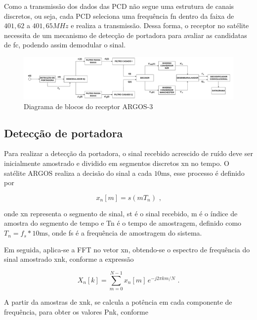 Como a transmissão dos dados das \gls{PCD} não segue uma estrutura de canais discretos, ou seja, cada \gls{PCD} seleciona uma frequência \gls{fn} dentro da faixa de $401,62$ a $401,65MHz$ e realiza a transmissão. Dessa forma, o receptor no satélite necessita de um mecanismo de detecção de portadora para avaliar as candidatas de \gls{fc}, podendo assim demodular o sinal.

\begin{figure}[H]
	\centering
	\caption{Diagrama de blocos do receptor ARGOS-3}\label{fig:diagrama_receptor}
	\includegraphics[width=\linewidth]{assets/cap2/receptor.pdf}
\end{figure}


\subsection{Detecção de portadora}

Para realizar a detecção da portadora, o sinal recebido acrescido de ruído deve ser inicialmente amostrado e dividido em segmentos discretos \gls{xn} no tempo. O satélite \gls{ARGOS} realiza a decisão do sinal a cada $10 \text{ms}$, esse processo é definido por 

\vspace{-0.4em}
\begin{equation}
    x_n[m] = s(mT_n) \text{ ,}
\end{equation}

\noindent onde \gls{xn} representa o segmento de sinal, \gls{st} é o sinal recebido, \gls{m} é o índice de amostra do segmento de tempo e \gls{Tn} é o tempo de amostragem, definido como $T_n = f_s * 10 \text{ms}$, onde \gls{fs} é a frequência de amostragem do sistema. 


Em seguida, aplica-se a \gls{FFT} no vetor \gls{xn}, obtendo-se o espectro de frequência do sinal amostrado \gls{xnk}, conforme a expressão 

\vspace{-0.4em}
\begin{equation}
    X_n[k] = \sum_{m=0}^{N-1} x_n[m]\, e^{-j2\pi km/N} \text{ .}
\end{equation}

A partir da amostras de \gls{xnk}, se calcula a potência em cada componente de frequência, para obter os valores \gls{Pnk}, conforme

